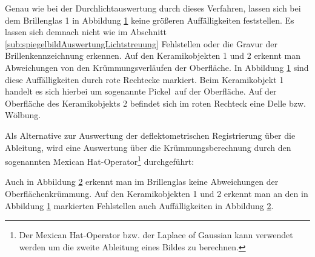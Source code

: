 {
	\begin{figure}[H]
		\centering
		
		\label{tikz:abbAbleitungRegistrierungSpiegel}
	\end{figure}
}

\noindent
Genau wie bei der Durchlichtauswertung durch dieses Verfahren, lassen sich bei dem Brillenglas 1 in Abbildung \ref{tikz:abbAbleitungRegistrierungSpiegel} keine größeren Auffälligkeiten feststellen.
Es lassen sich demnach nicht wie im Abschnitt \ref{sub:spiegelbildAuswertungLichtstreuung} Fehlstellen oder die Gravur der Brillenkennzeichnung erkennen.
Auf den Keramikobjekten 1 und 2 erkennt man Abweichungen von den Krümmungsverläufen der Oberfläche.
In Abbildung \ref{tikz:abbAbleitungRegistrierungSpiegel} sind diese Auffälligkeiten durch rote Rechtecke markiert.
Beim Keramikobjekt 1 handelt es sich hierbei um sogenannte  \glqq Pickel\grqq ~auf der Oberfläche.
Auf der Oberfläche des Keramikobjekts 2 befindet sich im roten Rechteck eine Delle bzw. Wölbung.

\p
Als Alternative zur Auswertung der deflektometrischen Registrierung über die Ableitung, wird eine Auswertung über die Krümmungsberechnung durch den sogenannten \glqq Mexican Hat\grqq -Operator\footnote{
Der \glqq Mexican Hat\grqq -Operator bzw. der Laplace of Gaussian kann verwendet werden um die zweite Ableitung eines Bildes zu berechnen.
} durchgeführt:

{
	\begin{figure}[H]
		\centering
		
		\label{tikz:abbMexicanHatRegistrierung}
	\end{figure}
}

\noindent
Auch in Abbildung \ref{tikz:abbMexicanHatRegistrierung} erkennt man im Brillenglas keine Abweichungen der Oberflächen\-krümmung.
Auf den Keramikobjekten 1 und 2 erkennt man an den in Abbildung \ref{tikz:abbAbleitungRegistrierungSpiegel} markierten Fehlstellen auch Auffälligkeiten in Abbildung \ref{tikz:abbMexicanHatRegistrierung}.